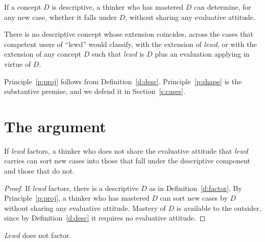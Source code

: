 \documentclass{situationist-preprint}
\begin{document}
\begin{principle}[Projection]\label{p:proj}
If a concept $D$ is descriptive, a thinker who has mastered $D$ can determine, for any new case, whether it falls under $D$, without sharing any evaluative attitude.
\end{principle}

\begin{principle}[Shapelessness]\label{p:shape}
There is no descriptive concept whose extension coincides, across the cases that competent users of \enquote{lewd} would classify, with the extension of \emph{lewd}, or with the extension of any concept $D$ such that \emph{lewd} is $D$ plus an evaluation applying in virtue of $D$.
\end{principle}

Principle~\ref{p:proj} follows from Definition~\ref{d:desc}. Principle~\ref{p:shape} is the substantive premise, and we defend it in Section~\ref{s:cases}.

\section{The argument}

\begin{lemma}\label{l:outsider}
If \emph{lewd} factors, a thinker who does not share the evaluative attitude that \emph{lewd} carries can sort new cases into those that fall under the descriptive component and those that do not.
\end{lemma}

\begin{proof}
If \emph{lewd} factors, there is a descriptive $D$ as in Definition~\ref{d:factor}. By Principle~\ref{p:proj}, a thinker who has mastered $D$ can sort new cases by $D$ without sharing any evaluative attitude. Mastery of $D$ is available to the outsider, since by Definition~\ref{d:desc} it requires no evaluative attitude.
\end{proof}

\begin{theorem}\label{t:main}
\emph{Lewd} does not factor.
\end{theorem}
\end{document}
